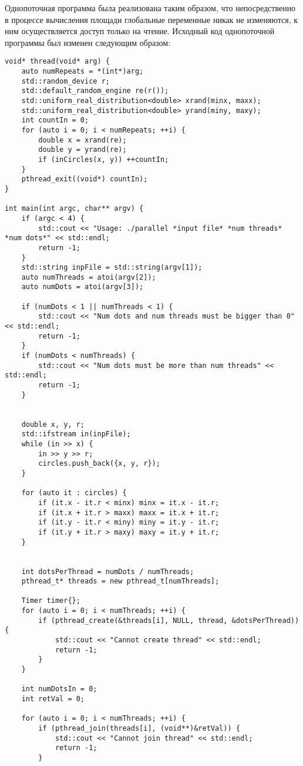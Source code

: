 Однопоточная программа была реализована таким образом, что непосредственно в процессе вычисления площади глобальные переменные никак не изменяются, к ним осуществляется доступ только на чтение. Исходный код однопоточной программы был изменен следующим образом:
\begin{lstlisting}[caption={Многопоточность на Pthreads}, label={lst:pthreads}, style=crs_cpp]
void* thread(void* arg) {
    auto numRepeats = *(int*)arg;
    std::random_device r;
    std::default_random_engine re(r());
    std::uniform_real_distribution<double> xrand(minx, maxx);
    std::uniform_real_distribution<double> yrand(miny, maxy);
    int countIn = 0;
    for (auto i = 0; i < numRepeats; ++i) {
        double x = xrand(re);
        double y = yrand(re);
        if (inCircles(x, y)) ++countIn;
    }
    pthread_exit((void*) countIn);
}

int main(int argc, char** argv) {
    if (argc < 4) {
        std::cout << "Usage: ./parallel *input file* *num threads* *num dots*" << std::endl;
        return -1;
    }
    std::string inpFile = std::string(argv[1]);
    auto numThreads = atoi(argv[2]);
    auto numDots = atoi(argv[3]);

    if (numDots < 1 || numThreads < 1) {
        std::cout << "Num dots and num threads must be bigger than 0" << std::endl;
        return -1;
    }
    if (numDots < numThreads) {
        std::cout << "Num dots must be more than num threads" << std::endl;
        return -1;
    }


    double x, y, r;
    std::ifstream in(inpFile);
    while (in >> x) {
        in >> y >> r;
        circles.push_back({x, y, r});
    }

    for (auto it : circles) {
        if (it.x - it.r < minx) minx = it.x - it.r;
        if (it.x + it.r > maxx) maxx = it.x + it.r;
        if (it.y - it.r < miny) miny = it.y - it.r;
        if (it.y + it.r > maxy) maxy = it.y + it.r;
    }


    int dotsPerThread = numDots / numThreads;
    pthread_t* threads = new pthread_t[numThreads];

    Timer timer{};
    for (auto i = 0; i < numThreads; ++i) {
        if (pthread_create(&threads[i], NULL, thread, &dotsPerThread)) {
            std::cout << "Cannot create thread" << std::endl;
            return -1;
        }
    }

    int numDotsIn = 0;
    int retVal = 0;

    for (auto i = 0; i < numThreads; ++i) {
        if (pthread_join(threads[i], (void**)&retVal)) {
            std::cout << "Cannot join thread" << std::endl;
            return -1;
        }


\end{lstlisting}
